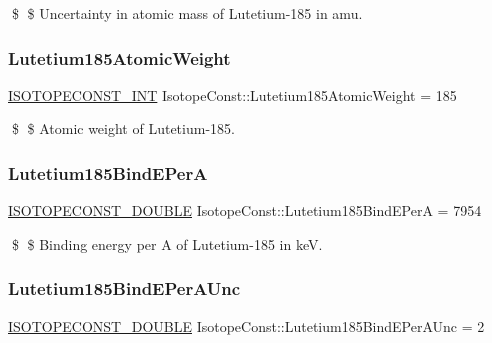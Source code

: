 \$ \$ Uncertainty in atomic mass of Lutetium-\/185 in amu. \mbox{\label{group___isotope_const-_lutetium-_lu185_gaa4743a1104465d4d6bd3fb6ae5e74919}} 
\subsubsection{\texorpdfstring{Lutetium185\+Atomic\+Weight}{Lutetium185AtomicWeight}}
{\footnotesize\ttfamily \mbox{\hyperlink{group___isotope_const-_macros_ga5f18360b3e99483a35c32d789e62621c}{I\+S\+O\+T\+O\+P\+E\+C\+O\+N\+S\+T\+\_\+\+I\+NT}} Isotope\+Const\+::\+Lutetium185\+Atomic\+Weight = 185}

\$ \$ Atomic weight of Lutetium-\/185. \mbox{\label{group___isotope_const-_lutetium-_lu185_gaa2c0a233efa738615b1ec4a5663bd9ab}} 
\subsubsection{\texorpdfstring{Lutetium185\+Bind\+E\+PerA}{Lutetium185BindEPerA}}
{\footnotesize\ttfamily \mbox{\hyperlink{group___isotope_const-_macros_ga8f45a7272ce02c0b4c65c44636ed719a}{I\+S\+O\+T\+O\+P\+E\+C\+O\+N\+S\+T\+\_\+\+D\+O\+U\+B\+LE}} Isotope\+Const\+::\+Lutetium185\+Bind\+E\+PerA = 7954}

\$ \$ Binding energy per A of Lutetium-\/185 in keV. \mbox{\label{group___isotope_const-_lutetium-_lu185_gaa10de1c246d1f52af1594b674eb09128}} 
\subsubsection{\texorpdfstring{Lutetium185\+Bind\+E\+Per\+A\+Unc}{Lutetium185BindEPerAUnc}}
{\footnotesize\ttfamily \mbox{\hyperlink{group___isotope_const-_macros_ga8f45a7272ce02c0b4c65c44636ed719a}{I\+S\+O\+T\+O\+P\+E\+C\+O\+N\+S\+T\+\_\+\+D\+O\+U\+B\+LE}} Isotope\+Const\+::\+Lutetium185\+Bind\+E\+Per\+A\+Unc = 2}

